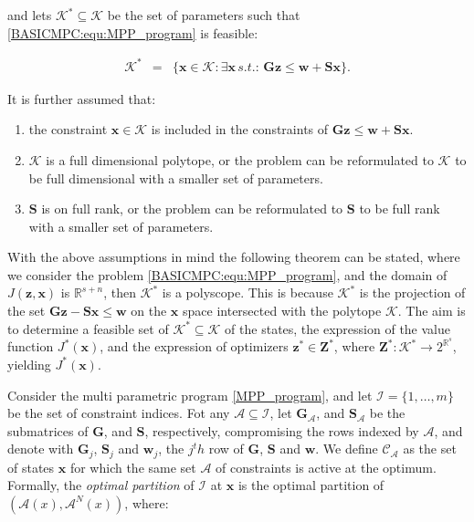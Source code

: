     and lets $\mathcal{K}^*\subseteq\mathcal{K}$ be the set of parameters such that \ref{BASICMPC:equ:MPP_program} is feasible:

    \begin{equation}
    \begin{array}{rcl}
            \mathcal{K}^*&=&\{\textbf{x}\in\mathcal{K}:\exists\textbf{x}\,s.t.:\,\textbf{Gz}\leq\textbf{w}+\textbf{Sx}\}.
        \end{array}
        \label{BASICMPC:equ:MPP_stateset_params}
    \end{equation}

    It is further assumed that:
    \begin{enumerate}
    \item the constraint $\textbf{x}\in\mathcal{K}$ is included in the constraints of $\textbf{Gz}\leq\textbf{w}+\textbf{Sx}$.
    \item $\mathcal{K}$ is a full dimensional polytope, or the problem can be reformulated to $\mathcal{K}$ to be full dimensional with a smaller set of parameters.
    \item $\textbf{S}$ is on full rank, or the problem can be reformulated to $\textbf{S}$ to be full rank with a smaller set of parameters.
    \end{enumerate}

    With the above assumptions in mind the following theorem can be stated, where we consider the problem \ref{BASICMPC:equ:MPP_program}, and the domain of $J(\textbf{z},\textbf{x})$ is $\mathbb{R}^{s+n}$, then $\mathcal{K}^*$ is a polyscope. This is because $\mathcal{K}^*$ is the projection of the set $\textbf{Gz}-\textbf{Sx}\leq\textbf{w}$ on the $\textbf{x}$ space intersected with the polytope $\mathcal{K}$. The aim is to determine a feasible set of $\mathcal{K}^*\subseteq\mathcal{K}$ of the states, the expression of the value function $J^*(\textbf{x})$, and the expression of optimizers $\textbf{z}^*\in\textbf{Z}^*$, where $\textbf{Z}^*:\mathcal{K}^*\rightarrow 2^{\mathbb{R}^s}$, yielding $J^*(\textbf{x})$.

    \label{BASICCSR:sec:MPP_Critical}

    Consider the multi parametric program \ref{MPP_program}, and let $\mathcal{I}=\{1,\dots,m\}$ be the set of constraint indices. Fot any $\mathcal{A}\subseteq\mathcal{I}$, let $\textbf{G}_{\mathcal{A}}$, and $\textbf{S}_{\mathcal{A}}$ be the submatrices of $\textbf{G}$, and $\textbf{S}$, respectively, compromising the rows indexed by $\mathcal{A}$, and denote with $\textbf{G}_j$, $\textbf{S}_j$ and $\textbf{w}_j$, the $j^th$ row of $\textbf{G}$, $\textbf{S}$ and $\textbf{w}$. We define $\mathcal{C}_{\mathcal{A}}$ as the set of states $\textbf{x}$ for which the same set $\mathcal{A}$ of constraints is active at the optimum. Formally, the \emph{optimal partition} of $\mathcal{I}$ at $\textbf{x}$ is the optimal partition of $(\mathcal{A}(x),\mathcal{A}^N(x))$, where:


